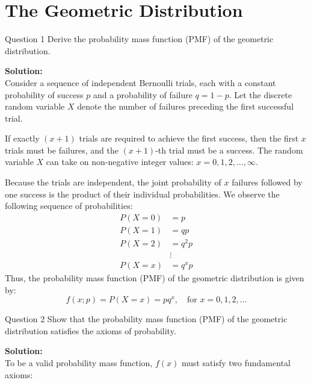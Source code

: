 \documentclass[11pt, a4paper]{article}
\begin{document}
\clearpage
\tableofcontents
\clearpage

\section{The Geometric Distribution}

\begin{problem}{Question 1}
Derive the probability mass function (PMF) of the geometric distribution.
\end{problem}

\noindent\textbf{Solution:} \\
Consider a sequence of independent Bernoulli trials, each with a constant probability of success $p$ and a probability of failure $q = 1 - p$. Let the discrete random variable $X$ denote the number of failures preceding the first successful trial. 

If exactly $(x+1)$ trials are required to achieve the first success, then the first $x$ trials must be failures, and the $(x+1)$-th trial must be a success. The random variable $X$ can take on non-negative integer values: $x = 0, 1, 2, \dots, \infty$.

Because the trials are independent, the joint probability of $x$ failures followed by one success is the product of their individual probabilities. We observe the following sequence of probabilities:
\begin{align*}
    P(X = 0) &= p \\
    P(X = 1) &= qp \\
    P(X = 2) &= q^2p \\
    &\vdots \\
    P(X = x) &= q^x p
\end{align*}
Thus, the probability mass function (PMF) of the geometric distribution is given by:
\begin{equation}
    f(x; p) = P(X = x) = p q^x, \quad \text{for } x = 0, 1, 2, \dots
\end{equation}

\vspace{0.5cm}
\begin{problem}{Question 2}
Show that the probability mass function (PMF) of the geometric distribution satisfies the axioms of probability.
\end{problem}

\noindent\textbf{Solution:} \\
To be a valid probability mass function, $f(x)$ must satisfy two fundamental axioms:
\end{document}
